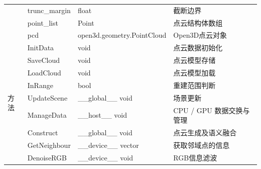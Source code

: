 \begin{table}[htb]
\begin{tabular}{|l|m{2.8cm}|m{4.7cm}|m{4.5cm}|}
		                     & \centering\arraybackslash trunc\_margin  & \centering\arraybackslash float                        & \centering\arraybackslash 截断边界                  \\ \cline{2-4}
		                     & \centering\arraybackslash point\_list    & \centering\arraybackslash Point                        & \centering\arraybackslash 点云结构体数组               \\ \cline{2-4}
		                     & \centering\arraybackslash pcd            & \centering\arraybackslash open3d.geometry.PointCloud   & \centering\arraybackslash Open3D点云对象            \\ \hline
		\multirow{14}{*}{方法} & \centering\arraybackslash InitData       & \centering\arraybackslash void                         & \centering\arraybackslash 点云数据初始化               \\ \cline{2-4}
		                     & \centering\arraybackslash SaveCloud      & \centering\arraybackslash void                         & \centering\arraybackslash 点云模型存储                \\ \cline{2-4}
		                     & \centering\arraybackslash LoadCloud      & \centering\arraybackslash void                         & \centering\arraybackslash 点云模型加载                \\ \cline{2-4}
		                     & \centering\arraybackslash InRange        & \centering\arraybackslash bool                         & \centering\arraybackslash 重建范围判断                \\ \cline{2-4}
		                     & \centering\arraybackslash UpdateScene    & \centering\arraybackslash \_\_global\_\_ void          & \centering\arraybackslash 场景更新                  \\ \cline{2-4}
		                     & \centering\arraybackslash ManageData     & \centering\arraybackslash \_\_host\_\_ void            & \centering\arraybackslash CPU / GPU 数据交换与管理     \\ \cline{2-4}
		                     & \centering\arraybackslash Construct      & \centering\arraybackslash \_\_global\_\_ void          & \centering\arraybackslash 点云生成及语义融合             \\ \cline{2-4}
		                     & \centering\arraybackslash GetNeighbour   & \centering\arraybackslash \_\_device\_\_ vector        & \centering\arraybackslash 获取邻域点的信息              \\ \cline{2-4}
		                     & \centering\arraybackslash DenoiseRGB     & \centering\arraybackslash \_\_device\_\_ void          & \centering\arraybackslash RGB信息滤波               \\ \cline{2-4}

\end{tabular}
\end{table}
